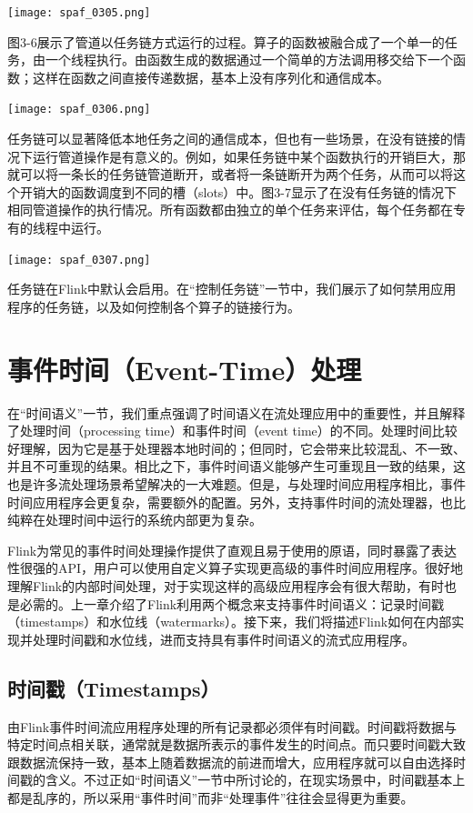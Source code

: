 \documentclass[oneside]{ctexbook}
\begin{document}
\noindent \texttt{[image: spaf\_0305.png]}

图3-6展示了管道以任务链方式运行的过程。算子的函数被融合成了一个单一的任务，由一个线程执行。由函数生成的数据通过一个简单的方法调用移交给下一个函数；这样在函数之间直接传递数据，基本上没有序列化和通信成本。

\noindent \texttt{[image: spaf\_0306.png]}

任务链可以显著降低本地任务之间的通信成本，但也有一些场景，在没有链接的情况下运行管道操作是有意义的。例如，如果任务链中某个函数执行的开销巨大，那就可以将一条长的任务链管道断开，或者将一条链断开为两个任务，从而可以将这个开销大的函数调度到不同的槽（slots）中。图3-7显示了在没有任务链的情况下相同管道操作的执行情况。所有函数都由独立的单个任务来评估，每个任务都在专有的线程中运行。

\noindent \texttt{[image: spaf\_0307.png]}

任务链在Flink中默认会启用。在“控制任务链”一节中，我们展示了如何禁用应用程序的任务链，以及如何控制各个算子的链接行为。

\section{事件时间（Event-Time）处理}

在“时间语义”一节，我们重点强调了时间语义在流处理应用中的重要性，并且解释了处理时间（processing time）和事件时间（event time）的不同。处理时间比较好理解，因为它是基于处理器本地时间的；但同时，它会带来比较混乱、不一致、并且不可重现的结果。相比之下，事件时间语义能够产生可重现且一致的结果，这也是许多流处理场景希望解决的一大难题。但是，与处理时间应用程序相比，事件时间应用程序会更复杂，需要额外的配置。另外，支持事件时间的流处理器，也比纯粹在处理时间中运行的系统内部更为复杂。

Flink为常见的事件时间处理操作提供了直观且易于使用的原语，同时暴露了表达性很强的API，用户可以使用自定义算子实现更高级的事件时间应用程序。很好地理解Flink的内部时间处理，对于实现这样的高级应用程序会有很大帮助，有时也是必需的。上一章介绍了Flink利用两个概念来支持事件时间语义：记录时间戳（timestamps）和水位线（watermarks）。接下来，我们将描述Flink如何在内部实现并处理时间戳和水位线，进而支持具有事件时间语义的流式应用程序。

\subsection{时间戳（Timestamps）}

由Flink事件时间流应用程序处理的所有记录都必须伴有时间戳。时间戳将数据与特定时间点相关联，通常就是数据所表示的事件发生的时间点。而只要时间戳大致跟数据流保持一致，基本上随着数据流的前进而增大，应用程序就可以自由选择时间戳的含义。不过正如“时间语义”一节中所讨论的，在现实场景中，时间戳基本上都是乱序的，所以采用“事件时间”而非“处理事件”往往会显得更为重要。
\end{document}
